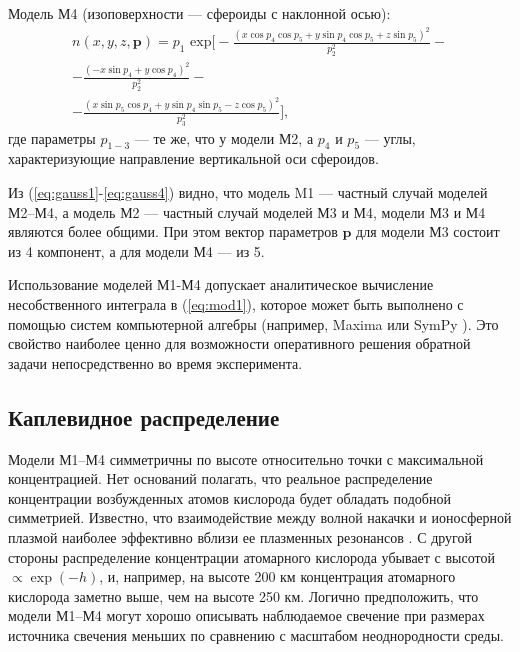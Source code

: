 \documentclass[12pt,a4paper]{article}
\renewcommand{\vec}{\mathbf}
\begin{document}
Модель М4 (изоповерхности --- сфероиды с наклонной осью):
\begin{equation}\label{eq:gauss4}
\begin{split}
n(x,y,z,\vec{p})=p_1 \text{ exp} \bigg[ 
-\frac{(x\cos{p_4}\cos{p_5} + y\sin{p_4}\cos{p_5} + z\sin{p_5})^2}{p_2^2}-\\
-\frac{(-x\sin{p_4} + y\cos{p_4})^2}{p_2^2} -\\ 
-\frac{(x\sin{p_5}\cos{p_4} + y\sin{p_4}\sin{p_5} - z\cos{p_5})^2}{p_3^2}\bigg],
\end{split}
\end{equation}
где параметры $p_{1-3}$ --- те же, что у модели М2, а $p_4$ и $p_5$ --- углы, характеризующие направление вертикальной оси сфероидов.

Из (\ref{eq:gauss1}-\ref{eq:gauss4}) видно, что модель M1 --- частный случай моделей М2--М4, а модель М2 --- частный случай моделей М3 и М4, модели М3 и М4 являются более общими. При этом вектор параметров $\vec{p}$ для модели М3 состоит из 4 компонент, а для модели М4 --- из 5.

Использование моделей М1-М4 допускает аналитическое вычисление несобственного интеграла в (\ref{eq:mod1}), которое может быть выполнено с помощью систем компьютерной алгебры (например, Maxima \cite{Maxima} или SymPy \cite{SymPy}). Это свойство наиболее ценно для возможности оперативного решения обратной задачи непосредственно во время эксперимента. 

\subsection{Каплевидное распределение} \label{subsec:model2}
Модели М1--М4 симметричны по высоте относительно точки с максимальной концентрацией. Нет оснований полагать, что реальное распределение концентрации возбужденных атомов кислорода будет обладать подобной симметрией. Известно, что взаимодействие между волной накачки и ионосферной плазмой наиболее эффективно вблизи ее плазменных резонансов \cite{Trach1979}. С другой стороны распределение концентрации атомарного кислорода убывает с высотой $\propto \exp {(-h)}$, и, например, на высоте 200 км концентрация атомарного кислорода заметно выше, чем на высоте 250 км. Логично предположить, что модели М1--М4 могут хорошо описывать наблюдаемое свечение при размерах источника свечения меньших по сравнению с масштабом неоднородности среды. 
\end{document}
